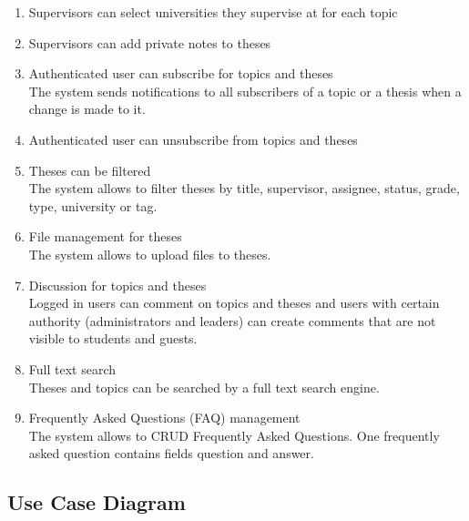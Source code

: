 \begin{enumerate}
    \item Supervisors can select universities they supervise at for each topic

    \item Supervisors can add private notes to theses

    \item Authenticated user can subscribe for topics and theses\\
    The system sends notifications to all subscribers of a topic or a thesis when a change is made to it.

    \item Authenticated user can unsubscribe from topics and theses

    \item Theses can be filtered\\
    The system allows to filter theses by title, supervisor, assignee, status, grade, type, university or tag.

    \item File management for theses\\
    The system allows to upload files to theses.

    \item Discussion for topics and theses\\
    Logged in users can comment on topics and theses and users with certain authority (administrators and leaders) can create comments that are not visible to students and guests.

    \item Full text search\\
    Theses and topics can be searched by a full text search engine.

    \item Frequently Asked Questions (FAQ) management\\
    The system allows to CRUD Frequently Asked Questions. One frequently asked question contains fields question and answer.

\end{enumerate}

\subsection{Use Case Diagram}

